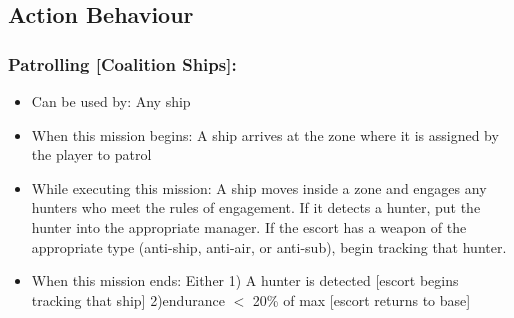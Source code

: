 \documentclass{article}
\begin{document}
\subsection{Action Behaviour}
    
    \subsubsection{Patrolling [Coalition Ships]:}
            \begin{itemize}
                \item{Can be used by:} Any ship
                \item{When this mission begins:} A ship arrives at the zone where it is assigned by the player to patrol
                \item{While executing this mission:} A ship moves inside a zone and engages any hunters who meet the rules of engagement. If it detects a hunter, put the hunter into the appropriate manager. If the escort has a weapon of the appropriate type (anti-ship, anti-air, or anti-sub), begin tracking that hunter.
                \item{When this mission ends:} Either 1) A hunter is detected [escort begins tracking that ship] 2)endurance $<$ 20\% of max [escort returns to base]
            \end{itemize}
            
\end{document}
